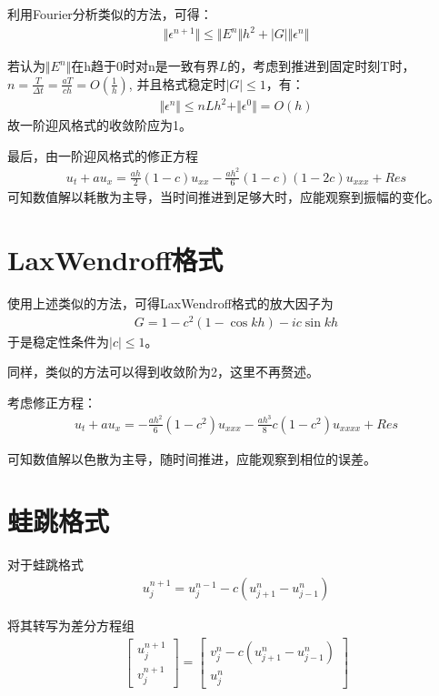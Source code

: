\documentclass[12pt, a4paper]{article}
\begin{document}
利用Fourier分析类似的方法，可得：
\begin{align}
  \Vert\epsilon^{n + 1}\Vert \leqslant \Vert E^n \Vert h^2 + |G|\Vert \epsilon^n \Vert
\end{align}

若认为$\Vert E^n \Vert$在h趋于0时对n是一致有界$L$的，考虑到推进到固定时刻T时，$n=\frac{T}{\Delta t}=\frac{aT}{ch}=O(\frac{1}{h})$,
并且格式稳定时$|G|\leqslant1$，有：
\begin{align}
  \Vert \epsilon^{n} \Vert \leqslant nLh^2 + \Vert \epsilon^{0} \Vert = O(h)
\end{align}
故一阶迎风格式的收敛阶应为1。

最后，由一阶迎风格式的修正方程
\begin{align}
  u_t + au_x = \frac{ah}{2}(1 - c)u_{xx} - \frac{ah^2}{6}(1 - c)(1 - 2c)u_{xxx} + Res
\end{align}
可知数值解以耗散为主导，当时间推进到足够大时，应能观察到振幅的变化。

\section{LaxWendroff格式}
使用上述类似的方法，可得LaxWendroff格式的放大因子为
\begin{align}
  G = 1 - c^2(1 - \cos kh) - ic\sin kh
\end{align}
于是稳定性条件为$|c|\leqslant 1$。

同样，类似的方法可以得到收敛阶为2，这里不再赘述。

考虑修正方程：
\begin{align}
  u_t + au_x = -\frac{ah^2}{6}(1 - c^2)u_{xxx} - \frac{ah^3}{8}c(1 - c^2)u_{xxxx} + Res
\end{align}

可知数值解以色散为主导，随时间推进，应能观察到相位的误差。

\section{蛙跳格式}
对于蛙跳格式
\begin{align}
  u^{n + 1}_{j} = u^{n - 1}_j - c(u^n_{j + 1} - u^n_{j - 1})
\end{align}

将其转写为差分方程组
\begin{align}
  \begin{bmatrix}
    u^{n + 1}_j \\
    v^{n + 1}_j
  \end{bmatrix}
  =
  \begin{bmatrix}
    v_j^n - c(u^n_{j + 1} - u^n_{j - 1}) \\
    u_j^n
  \end{bmatrix}
\end{align}
\end{document}
